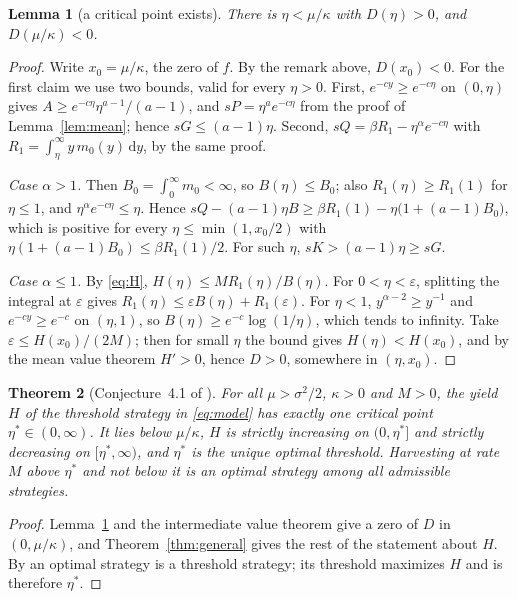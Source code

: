 \documentclass[11pt]{article}
\newtheorem{theorem}{Theorem}[section]
\newtheorem{lemma}[theorem]{Lemma}
\theoremstyle{definition}
\newcommand{\dd}{\,\mathrm{d}}
\begin{document}
\begin{lemma}[a critical point exists]\label{lem:exist}
There is $\eta < \mu/\kappa$ with $D(\eta) > 0$, and $D(\mu/\kappa) < 0$.
\end{lemma}

\begin{proof}
Write $x_0 = \mu/\kappa$, the zero of $f$. By the remark above, $D(x_0) < 0$. For the first claim we use two
bounds, valid for every $\eta > 0$. First, $e^{-cy} \ge e^{-c\eta}$ on $(0,\eta)$ gives
$A \ge e^{-c\eta}\eta^{a-1}/(a-1)$, and $sP = \eta^a e^{-c\eta}$ from the proof of Lemma~\ref{lem:mean}; hence
$sG \le (a-1)\eta$. Second, $sQ = \beta R_1 - \eta^\alpha e^{-c\eta}$ with $R_1 = \int_\eta^\infty y\,m_0(y)\dd y$,
by the same proof.

\emph{Case $\alpha > 1$.} Then $B_0 = \int_0^\infty m_0 < \infty$, so $B(\eta) \le B_0$; also $R_1(\eta) \ge
R_1(1)$ for $\eta \le 1$, and $\eta^\alpha e^{-c\eta} \le \eta$. Hence
$sQ - (a-1)\eta B \ge \beta R_1(1) - \eta\bigl(1 + (a-1)B_0\bigr)$, which is positive for every
$\eta \le \min(1, x_0/2)$ with $\eta(1 + (a-1)B_0) \le \beta R_1(1)/2$. For such $\eta$,
$sK > (a-1)\eta \ge sG$.

\emph{Case $\alpha \le 1$.} By \eqref{eq:H}, $H(\eta) \le M R_1(\eta)/B(\eta)$. For $0 < \eta < \varepsilon$,
splitting the integral at $\varepsilon$ gives $R_1(\eta) \le \varepsilon B(\eta) + R_1(\varepsilon)$. For
$\eta < 1$, $y^{\alpha-2} \ge y^{-1}$ and $e^{-cy} \ge e^{-c}$ on $(\eta,1)$, so
$B(\eta) \ge e^{-c}\log(1/\eta)$, which tends to infinity. Take $\varepsilon \le H(x_0)/(2M)$; then for small
$\eta$ the bound gives $H(\eta) < H(x_0)$, and by the mean value theorem $H' > 0$, hence $D > 0$, somewhere in
$(\eta, x_0)$.
\end{proof}

\begin{theorem}[Conjecture~4.1 of \cite{hening19}]\label{thm:logistic}
For all $\mu > \sigma^2/2$, $\kappa > 0$ and $M > 0$, the yield $H$ of the threshold strategy in \eqref{eq:model}
has exactly one critical point $\eta^* \in (0,\infty)$. It lies below $\mu/\kappa$, $H$ is strictly increasing on
$(0,\eta^*]$ and strictly decreasing on $[\eta^*,\infty)$, and $\eta^*$ is the unique optimal threshold.
Harvesting at rate $M$ above $\eta^*$ and not below it is an optimal strategy among all admissible strategies.
\end{theorem}

\begin{proof}
Lemma~\ref{lem:exist} and the intermediate value theorem give a zero of $D$ in $(0,\mu/\kappa)$, and
Theorem~\ref{thm:general} gives the rest of the statement about $H$. By \cite[Theorem~2.1]{hening19} an
optimal strategy is a threshold strategy; its threshold maximizes $H$ and is therefore $\eta^*$.
\end{proof}
\end{document}
